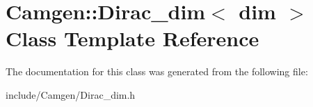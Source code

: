 \hypertarget{a00131}{\section{Camgen\-:\-:Dirac\-\_\-dim$<$ dim $>$ Class Template Reference}
\label{a00131}
}


The documentation for this class was generated from the following file\-:\begin{DoxyCompactItemize}
\item 
include/\-Camgen/Dirac\-\_\-dim.\-h\end{DoxyCompactItemize}
